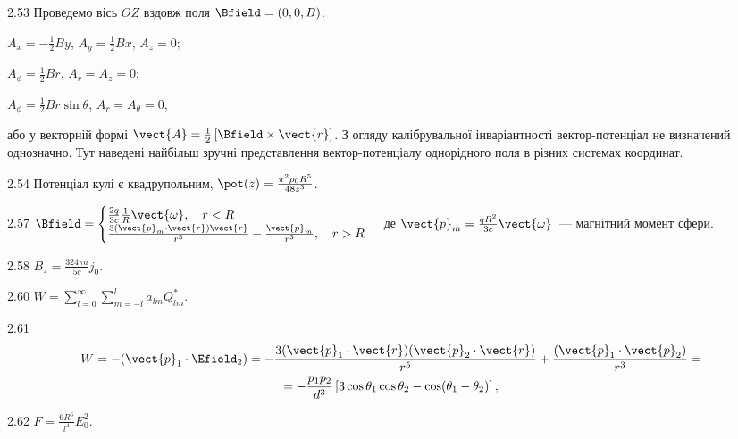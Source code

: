 \begin{Solution}{2.{53}}
	Проведемо вісь $OZ$ вздовж поля $\Bfield = (0, 0, B)$.
	\begin{enumerate*}[label=\alph*)]
		\item $A_x = -\frac12 By$, $A_y = \frac12 Bx$, $A_z = 0$;
		\item $A_{\phi} = \frac12 Br$, $A_r = A_z = 0$;
		\item $A_{\phi} = \frac12 Br\sin\theta$, $A_r = A_{\theta} = 0$,
	\end{enumerate*}
або у векторній формі 	$\vect{A} = \frac12 \left[ \Bfield\times \vect{r} \right] $.
	З огляду калібрувальної інваріантності вектор-потенціал не визначений однозначно. Тут наведені найбільш зручні представлення вектор-потенціалу однорідного поля в різних системах координат.
\end{Solution}
\begin{Solution}{2.{54}}
	Потенціал кулі є квадрупольним, $\pot(z) = \frac{\pi^2\rho_0 R^5}{48z^3}$.
\end{Solution}
\begin{Solution}{2.{57}}
	$\Bfield =
		\begin{cases}
			\frac{2q}{3c}\frac1R\vect{\omega}, \quad r < R \\
			\frac{3(\vect{p}_m \cdot \vect{r})\vect{r}}{r^5} - \frac{\vect{p}_m}{r^3}, \quad r > R
		\end{cases}
	$
	де $\vect{p}_m = \frac{qR^2}{3c}\vect{\omega}$~--- магнітний момент сфери.
\end{Solution}
\begin{Solution}{2.{58}}
	$B_z = \frac{324\pi a}{5c}j_0$.
\end{Solution}
\begin{Solution}{2.{60}}
    $W = \sum\limits_{l=0}^{\infty}\sum\limits_{m=-l}^{l}a_{lm}Q_{lm}^*$.
\end{Solution}
\begin{Solution}{2.{61}}
    \begin{multline*}
    	W = -(\vect{p}_1\cdot \Efield_2) = -\frac{3(\vect{p}_1\cdot\vect{r})(\vect{p}_2\cdot\vect{r})}{r^5}  + \frac{(\vect{p}_1\cdot\vect{p}_2)}{r^3} =\\ = -\frac{p_1p_2}{d^3}\left[ 3\cos\theta_1\cos\theta_2 - \cos(\theta_1 - \theta_2)\right] ,
    \end{multline*}
\end{Solution}
\begin{Solution}{2.{62}}
	$F = \frac{6R^6}{l^4} E_0^2$.
\end{Solution}
